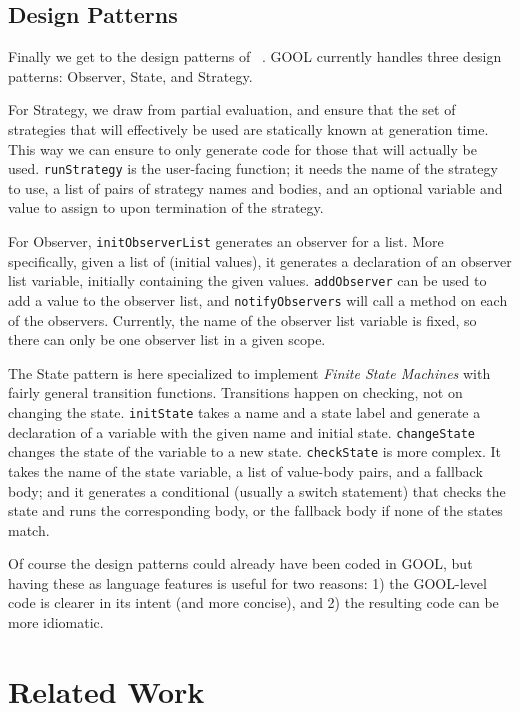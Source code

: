 \documentclass[sigplan,review,anonymous,prologue,dvipsnames]{acmart}
\begin{document}
\subsection{Design Patterns}
Finally we get to the design patterns of ~\cite{gamma1995design}. GOOL
currently handles three design patterns: Observer,
State, and Strategy. 

For Strategy, we draw from partial evaluation, and ensure that the set of
strategies that will effectively be used are statically known at generation
time.  This way we can ensure to only generate code for those that will
actually be used.  \verb|runStrategy| is the user-facing function; it needs the
name of the strategy to use, a list of pairs of strategy names and bodies, and
an optional variable and value to assign to upon termination of the strategy.

For Observer, \verb|initObserverList| generates an observer for a list.  More
specifically, given a list of (initial values), it generates a declaration of
an observer list variable, initially containing the given values.
\verb|addObserver| can be used to add a value to the observer list, and
\verb|notifyObservers| will call a method on each of the observers. Currently,
the name of the observer list variable is fixed, so there can only be one
observer list in a given scope.

The State pattern is here specialized to implement \emph{Finite State Machines}
with fairly general transition functions.  Transitions happen on checking, not
on changing the state.  \verb|initState| takes a name and a state label and
generate a declaration of a variable with the given name and initial state.
\verb|changeState| changes the state of the variable to a new state.
\verb|checkState| is more complex.  It takes the name of the state variable, a
list of value-body pairs, and a fallback body; and it generates a conditional
(usually a switch statement) that checks the state and runs the corresponding
body, or the fallback body if none of the states match.

Of course the design patterns could already have been coded in GOOL, but
having these as language features is useful for two reasons: 1) the GOOL-level
code is clearer in its intent (and more concise), and 2) the resulting code
can be more idiomatic.


\section{Related Work} \label{sec:related}
\end{document}
